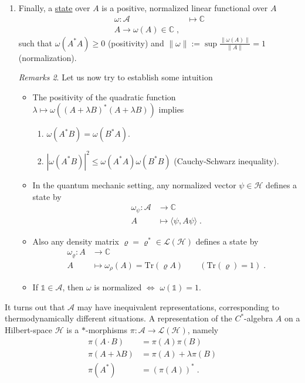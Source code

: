 \documentclass[
a4paper, %
11pt, %
onecolumn, %
openany, %
]{memoir}
\theoremstyle{definition}
\theoremstyle{remark}
\newtheorem{remarks}{Remarks}[chapter]
\theoremstyle{plain}
\begin{document}
\begin{enumerate}
\begin{remarks}
\end{remarks}
\item Finally, a \underline{state} over $A$ is a positive, normalized linear functional over $A$ \begin{align*}
\omega:\mathcal{A}&\longmapsto \mathbb{C}\\
A\longrightarrow \omega(A)\in\mathbb{C}\; ,
\end{align*}
such that $\omega(A^*A)\geq 0$ (positivity) and $\|\omega \| :=\sup \frac{\|\omega(A)\|}{\|A\|}=1$ (normalization).
\begin{remarks}
	Let us now try to establish some intuition \begin{itemize}
		\item The positivity of the quadratic function $\lambda\mapsto \omega((A+\lambda B)^*(A+\lambda B))$ implies 
		\begin{enumerate}
			\item $\omega(A^*B)=\omega(B^*A)$.
			\item $|\omega(A^*B)|^2\leq \omega(A^*A)\omega(B^*B)$ (Cauchy-Schwarz inequality).
		\end{enumerate}
		\item In the quantum mechanic setting, any normalized vector $\psi\in\mathcal{H}$ defines a state by \begin{align}\omega_{\psi}:\mathcal{A}&\longrightarrow \mathbb{C}\\
		A&\longmapsto \langle \psi, A\psi\rangle \; .\end{align}
		\item Also any density matrix $\varrho = \varrho^*\in \mathcal{L}(\mathcal{H})$ defines a state by \begin{align}
		\omega_{\varrho}:A&\longrightarrow \mathbb{C}\\
		A&\longmapsto \omega_{\rho}(A)=\mathrm{Tr}(\varrho A) \qquad (\mathrm{Tr}(\varrho)=1) \; .
		\end{align}
		\item If $\mathds{1}\in\mathcal{A}$, then $\omega$ is normalized $\Leftrightarrow$ $\omega(\mathds{1})=1$.
		\end{itemize}
\end{remarks}
\end{enumerate}
It turns out that $\mathcal{A}$ may have inequivalent representations, corresponding to thermodynamically different situations. A representation of the $C^*$-algebra $A$ on a Hilbert-space $\mathcal{H}$ is a $*$-morphisms
$\pi:\mathcal{A}\longrightarrow \mathcal{L}(\mathcal{H})$, namely \begin{align}
\pi(A\cdot B)&=\pi(A)\pi(B) \\
\pi(A+\lambda B)&=\pi(A)+\lambda\pi(B)\\
\pi(A^*)&=(\pi(A))^*\;.
\end{align}
\end{document}

